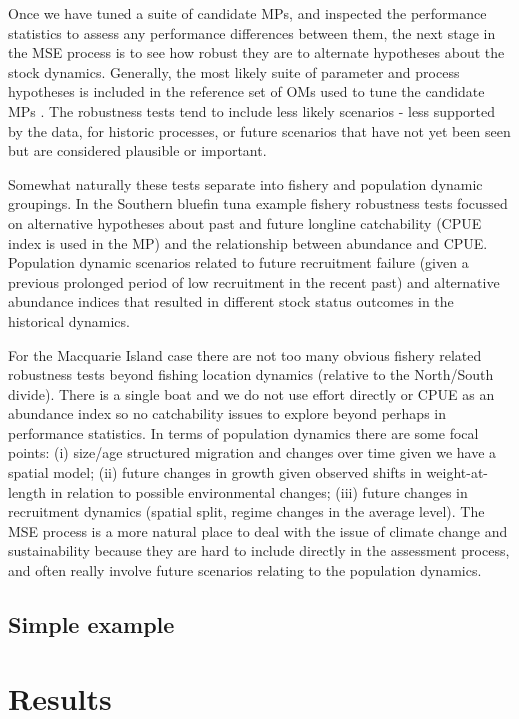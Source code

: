 \documentclass[12pt,a4paper,twoside,times,sky,standard]{csiroreport2017}
\begin{document}
Once we have tuned a suite of candidate MPs, and inspected the performance statistics to assess any performance differences between them, the next stage in the MSE process is to see how robust they are to alternate hypotheses about the stock dynamics. Generally, the most likely suite of parameter and process hypotheses is included in the reference set of OMs used to tune the candidate MPs \cite{mse,sbtmp}. The robustness tests tend to include less likely scenarios - less supported by the data, for historic processes, or future scenarios that have not yet been seen but are considered plausible or important.

Somewhat naturally these tests separate into fishery and population dynamic groupings. In the Southern bluefin tuna example \cite{sbtmp} fishery robustness tests focussed on alternative hypotheses about past and future longline catchability (CPUE index is used in the MP) and the relationship between abundance and CPUE. Population dynamic scenarios related to future recruitment failure (given a previous prolonged period of low recruitment in the recent past) and alternative abundance indices that resulted in different stock status outcomes in the historical dynamics. 

For the Macquarie Island case there are not too many obvious fishery related robustness tests beyond fishing location dynamics (relative to the North/South divide). There is a single boat and we do not use effort directly or CPUE as an abundance index so no catchability issues to explore beyond perhaps in performance statistics. In terms of population dynamics there are some focal points: (i) size/age structured migration and changes over time given we have a spatial model; (ii) future changes in growth given observed shifts in weight-at-length in relation to possible environmental changes; (iii) future changes in recruitment dynamics (spatial split, regime changes in the average level). The MSE process is a more natural place to deal with the issue of climate change and sustainability because they are hard to include directly in the assessment process, and often really involve future scenarios relating to the population dynamics.

\subsection{Simple example}

\section{Results}
\end{document}
